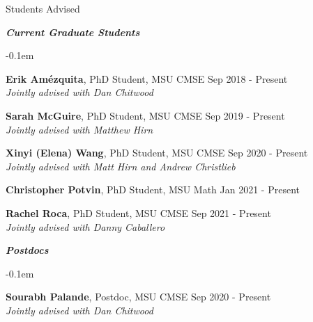 \documentclass{resume} %
\begin{document}
\begin{rSection}{Students Advised}


\textbf{\textit{Current Graduate Students}}
\begin{list}{}{\leftmargin=1em}
   \itemsep -0.1em %






   \item \textbf{Erik Am\'ezquita}, PhD Student, MSU CMSE \hfill Sep 2018 - Present
\\
   \phantom{XXX} \textit{Jointly advised with Dan Chitwood}
   \item \textbf{Sarah McGuire}, PhD Student, MSU CMSE \hfill Sep 2019 - Present
\\
   \phantom{XXX} \textit{Jointly advised with Matthew Hirn}



   \item \textbf{Xinyi (Elena) Wang}, PhD Student, MSU CMSE \hfill Sep 2020 - Present
\\
   \phantom{XXX} \textit{Jointly advised with Matt Hirn and Andrew Christlieb}

   \item \textbf{Christopher Potvin}, PhD Student, MSU Math \hfill Jan 2021 - Present

   \item \textbf{Rachel Roca}, PhD Student, MSU CMSE \hfill Sep 2021 - Present
\\
   \phantom{XXX} \textit{Jointly advised with Danny Caballero}

\end{list}


\textbf{\textit{Postdocs}}
\begin{list}{}{\leftmargin=1em}
   \itemsep -0.1em %


   \item \textbf{Sourabh Palande}, Postdoc, MSU CMSE \hfill Sep 2020 - Present\\
   \phantom{XXX} \textit{Jointly advised with Dan Chitwood}


\end{list}
\end{rSection}
\end{document}
